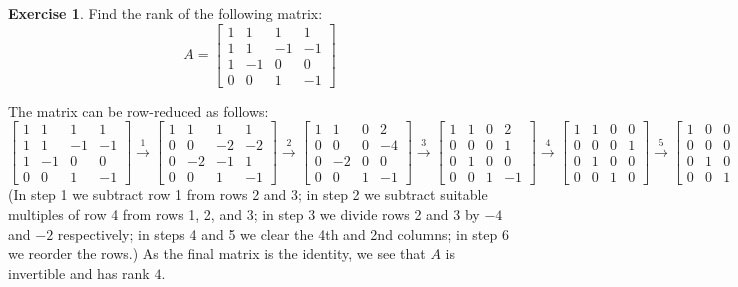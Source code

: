 \documentclass{amsart}
\newcommand{\bsm}       {\left[\begin{smallmatrix}}
\newcommand{\esm}       {\end{smallmatrix}\right]}
\newcommand{\xra}       {\xrightarrow}
\renewcommand{\:}       {\colon}
\theoremstyle{definition}
\newtheorem{exercise}{Exercise}[section]
\renewenvironment{solution}{\SolutionAtEnd}{\endSolutionAtEnd}
\begin{document}
\begin{exercise}\label{ex-rank}
 Find the rank of the following matrix:
 \[ A = \bsm  1 &  1 &  1 &  1 \\
              1 &  1 & -1 & -1 \\
              1 & -1 &  0 &  0 \\
              0 &  0 &  1 & -1 \esm
 \]
\end{exercise}
\begin{solution}
 The matrix can be row-reduced as follows:
 {\tiny \[
  \bsm  1 &  1 &  1 &  1 \\
        1 &  1 & -1 & -1 \\
        1 & -1 &  0 &  0 \\
        0 &  0 &  1 & -1 \esm \xra{1}
  \bsm  1 &  1 &  1 &  1 \\
        0 &  0 & -2 & -2 \\
        0 & -2 & -1 &  1 \\
        0 &  0 &  1 & -1 \esm \xra{2}
  \bsm  1 &  1 &  0 &  2 \\
        0 &  0 &  0 & -4 \\
        0 & -2 &  0 &  0 \\
        0 &  0 &  1 & -1 \esm \xra{3}
  \bsm  1 &  1 &  0 &  2 \\
        0 &  0 &  0 &  1 \\
        0 &  1 &  0 &  0 \\
        0 &  0 &  1 & -1 \esm \xra{4}
  \bsm  1 &  1 &  0 &  0 \\
        0 &  0 &  0 &  1 \\
        0 &  1 &  0 &  0 \\
        0 &  0 &  1 &  0 \esm \xra{5}
  \bsm  1 &  0 &  0 &  0 \\
        0 &  0 &  0 &  1 \\
        0 &  1 &  0 &  0 \\
        0 &  0 &  1 &  0 \esm \xra{6}
  \bsm  1 &  0 &  0 &  0 \\
        0 &  1 &  0 &  0 \\
        0 &  0 &  1 &  0 \\
        0 &  0 &  0 &  1 \esm.
 \]}
 (In step 1 we subtract row 1 from rows 2 and 3; in step 2
 we subtract suitable multiples of row 4 from rows 1, 2, and
 3; in step 3 we divide rows 2 and 3 by $-4$ and $-2$
 respectively; in steps 4 and 5 we clear the 4th and 2nd
 columns; in step 6 we reorder the rows.)  As the final
 matrix is the identity, we see that $A$ is invertible and
 has rank $4$. 
\end{solution}
\end{document}
